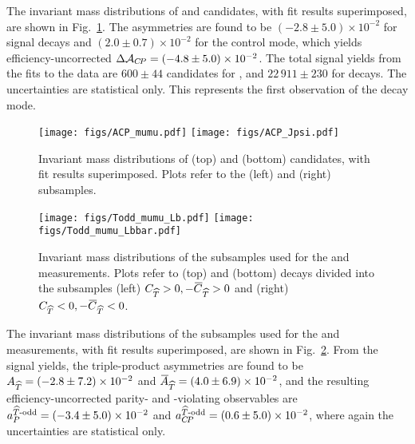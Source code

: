 The invariant mass distributions of \LK and \LKJ candidates, with fit results superimposed, are shown in Fig.~\ref{fig:ACPfit}.
The \Araw asymmetries are found to be $(-2.8\pm 5.0)\times 10^{-2}$ for signal decays and $(2.0\pm 0.7)\times 10^{-2}$ for the control mode, which yields efficiency-uncorrected ${\Delta\mathcal{A}_{{C\!P}}} = (-4.8 \pm 5.0)\times 10^{-2}$. The total signal yields from the fits to the data are $600 \pm 44$ candidates for \LK, and $22\,911\pm 230$ for \LKJ decays. The uncertainties are statistical only. This represents the first observation of the \LK decay mode.
\begin{figure}
\centering
\texttt{[image: figs/ACP\_mumu.pdf]}
\texttt{[image: figs/ACP\_Jpsi.pdf]}
\caption{Invariant mass distributions of (top) \LK and (bottom) \LKJ candidates, with fit results superimposed. Plots refer to the (left) \Lb and (right) \Lbbar subsamples.\label{fig:ACPfit}}
\end{figure}

\begin{figure}
\centering
\texttt{[image: figs/Todd\_mumu\_Lb.pdf]}
\texttt{[image: figs/Todd\_mumu\_Lbbar.pdf]}
\caption{Invariant mass distributions of the \LK subsamples used for the \AT and \ATbar measurements. Plots refer to (top) \Lb and (bottom) \Lbbar decays divided into the subsamples (left) ${C_{\widehat{T}}}>0,-{\kern 0.1em\overline{\kern -0.1em C}_{\widehat{T}}}>0$ and (right) ${C_{\widehat{T}}}<0,-{\kern 0.1em\overline{\kern -0.1em C}_{\widehat{T}}}<0$.\label{fig::Toddfit}}
\end{figure}

The invariant mass distributions of the \LK subsamples used for the \AT and \ATbar measurements, with fit results superimposed, are shown in Fig.~\ref{fig::Toddfit}. From the signal yields, the triple-product asymmetries are found to be ${A_{\widehat{T}}} = (-2.8\pm 7.2)\times 10^{-2}$ and ${\kern 0.1em\overline{\kern -0.1em A}_{\widehat{T}}} = (4.0\pm 6.9)\times 10^{-2}$, and the resulting efficiency-uncorrected parity- and \CP-violating observables are
${a_P^{\widehat{T}\text{-odd}}} = (-3.4 \pm 5.0)\times 10^{-2}$ and 
$a_{C\!P}^{\widehat{T}\text{-odd}} = (0.6\pm 5.0)\times 10^{-2}$, where again the uncertainties are statistical only.
